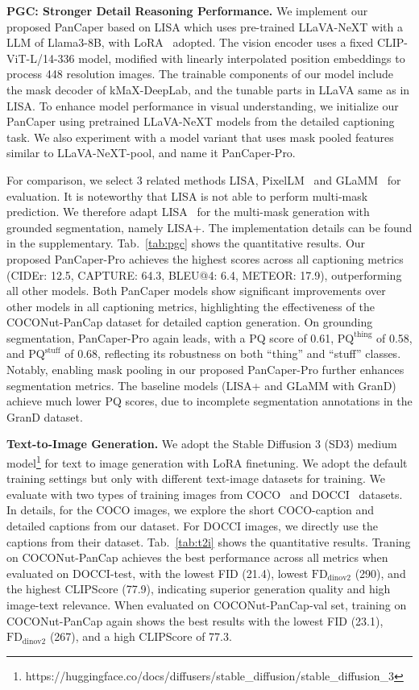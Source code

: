 \noindent\textbf{PGC: Stronger Detail Reasoning Performance.} We implement our proposed PanCaper based on LISA which uses pre-trained LLaVA-NeXT with a LLM of Llama3-8B, with LoRA~\cite{hu2021lora} adopted. The vision encoder uses a fixed CLIP-ViT-L/14-336 model, modified with linearly interpolated position embeddings to process 448 resolution images. The trainable components of our model include the mask decoder of kMaX-DeepLab, and the tunable parts in LLaVA same as in LISA. To enhance model performance in visual understanding, we initialize our PanCaper using pretrained LLaVA-NeXT models from the detailed captioning task. We also experiment with a model variant that uses mask pooled features similar to LLaVA-NeXT-pool, and name it PanCaper-Pro.

For comparison, we select 3 related methods LISA, PixelLM~\cite{ren2024pixellm} and GLaMM~\cite{hanoona2023GLaMM} for evaluation. It is noteworthy that LISA is not able to perform multi-mask prediction. We therefore adapt LISA~\cite{lai2024lisa} for the multi-mask generation with grounded segmentation, namely LISA+. The implementation details can be found in the supplementary. Tab.~\ref{tab:pgc} shows the quantitative results. Our proposed PanCaper-Pro achieves the highest scores across all captioning metrics (CIDEr: 12.5, CAPTURE: 64.3, BLEU@4: 6.4, METEOR: 17.9), outperforming all other models. Both PanCaper models show significant improvements over other models in all captioning metrics, highlighting the effectiveness of the COCONut-PanCap dataset for detailed caption generation. On grounding segmentation, PanCaper-Pro again leads, with a PQ score of 0.61, $\text{PQ}^\text{thing}$ of 0.58, and $\text{PQ}^\text{stuff}$ of 0.68, reflecting its robustness on both ``thing'' and ``stuff'' classes. Notably, enabling mask pooling in our proposed PanCaper-Pro further enhances segmentation metrics. The baseline models (LISA+ and GLaMM with GranD) achieve much lower PQ scores, due to incomplete segmentation annotations in the GranD dataset. 


\noindent\textbf{Text-to-Image Generation.} We adopt the Stable Diffusion 3 (SD3) medium model\footnote{\scriptsize https://huggingface.co/docs/diffusers/stable\_diffusion/stable\_diffusion\_3} for text to image generation with LoRA finetuning. We adopt the default training settings but only with different text-image datasets for training. We evaluate with two types of training images from COCO~\cite{lin2014coco} and DOCCI~\cite{Onoe2024docci} datasets. In details, for the COCO images, we explore the short COCO-caption and detailed captions from our dataset. For DOCCI images, we directly use the captions from their dataset. Tab.~\ref{tab:t2i} shows the quantitative results. Traning on COCONut-PanCap achieves the best performance across all metrics when evaluated on DOCCI-test, with the lowest FID (21.4), lowest $\text{FD}_{\text{dinov2}}$ (290), and the highest CLIPScore (77.9), indicating superior generation quality and high image-text relevance. 
When evaluated on COCONut-PanCap-val set, training on COCONut-PanCap again shows the best results with the lowest FID (23.1), $\text{FD}_{\text{dinov2}}$ (267), and a high CLIPScore of 77.3.

